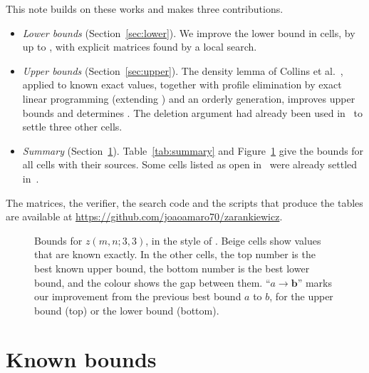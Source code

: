 \documentclass[11pt]{article}
\begin{document}
This note builds on these works and makes three contributions.
\begin{itemize}
  \item \emph{Lower bounds} (Section~\ref{sec:lower}). We improve the lower
    bound in \NumImprovedWord{} cells, by up to \MaxGain, with explicit
    matrices found by a local search.
  \item \emph{Upper bounds} (Section~\ref{sec:upper}). The density lemma of
    Collins et al.~\cite{CRWR16}, applied to known exact values, together
    with profile elimination by exact linear programming (extending
    \cite{Afr26}) and an orderly generation, improves \NumUBImproved{}
    upper bounds and determines \ClosedList. The deletion argument had
    already been used in~\cite{Fie26} to settle three other cells.
  \item \emph{Summary} (Section~\ref{sec:known}). Table~\ref{tab:summary}
    and Figure~\ref{fig:heatmap} give the bounds for all \NumOpen{} cells
    with their sources. Some cells listed as open in~\cite{BNRL26} were
    already settled in~\cite{Tan22,CRWR16}.
\end{itemize}
The matrices, the verifier, the search code and the scripts that produce
the tables are available at
\url{https://github.com/joaoamaro70/zarankiewicz}.

\begin{figure}[t]
\centering

\caption{Bounds for $z(m,n;3,3)$, in the style of
\cite[Figure~2]{BNRL26}. Beige cells show values that are known exactly.
In the other
cells, the top number is the best known upper bound, the bottom number is
the best lower bound, and the colour shows the gap between them.
``$a\to\mathbf{b}$'' marks our improvement from the previous best bound $a$
to $b$, for the upper bound (top) or the lower bound (bottom).}
\label{fig:heatmap}
\end{figure}

\section{Known bounds}\label{sec:known}
\end{document}
